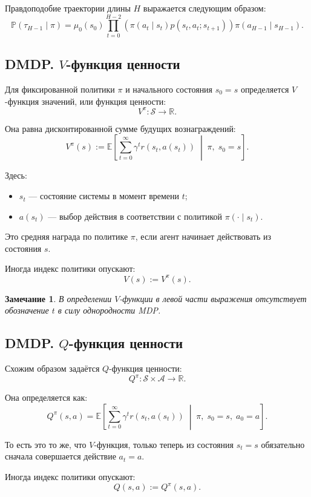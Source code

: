 \documentclass[12pt,a4paper]{article}
\newtheorem{remark}{Замечание}
\begin{document}
Правдоподобие траектории длины $H$ выражается следующим образом:
\[
\mathbb P(\tau_{H-1} \mid \pi)
=
\mu_0(s_0)
\prod_{t=0}^{H-2}
\left(
\pi(a_t \mid s_t)p(s_t,a_t;s_{t+1})
\right)
\pi(a_{H-1} \mid s_{H-1}).
\]

\subsection{DMDP. $V$-функция ценности}

Для фиксированной политики $\pi$ и начального состояния $s_0=s$ определяется $V$-функция значений, или функция ценности:
\[
V^\pi : \mathcal S \to \mathbb R.
\]

Она равна дисконтированной сумме будущих вознаграждений:
\[
V^\pi(s)
:=
\mathbb E
\left[
\sum_{t=0}^{\infty}
\gamma^t r(s_t,a(s_t))
\;\middle|\;
\pi,\; s_0=s
\right].
\]

Здесь:
\begin{itemize}
    \item $s_t$ --- состояние системы в момент времени $t$;
    \item $a(s_t)$ --- выбор действия в соответствии с политикой $\pi(\cdot \mid s_t)$.
\end{itemize}

Это средняя награда по политике $\pi$, если агент начинает действовать из состояния $s$.

Иногда индекс политики опускают:
\[
V(s) := V^\pi(s).
\]

\begin{remark}
В определении $V$-функции в левой части выражения отсутствует обозначение $t$ в силу однородности MDP.
\end{remark}

\subsection{DMDP. $Q$-функция ценности}

Схожим образом задаётся $Q$-функция ценности:
\[
Q^\pi : \mathcal S \times \mathcal A \to \mathbb R.
\]

Она определяется как:
\[
Q^\pi(s,a)
=
\mathbb E
\left[
\sum_{t=0}^{\infty}
\gamma^t r(s_t,a(s_t))
\;\middle|\;
\pi,\; s_0=s,\; a_0=a
\right].
\]

То есть это то же, что $V$-функция, только теперь из состояния $s_t=s$ обязательно сначала совершается действие $a_t=a$.

Иногда индекс политики опускают:
\[
Q(s,a) := Q^\pi(s,a).
\]
\end{document}
